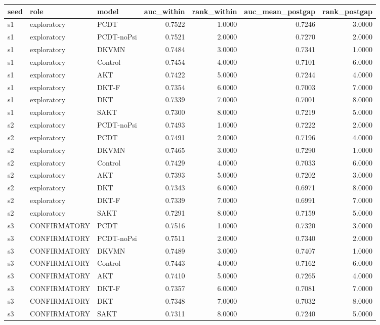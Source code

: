 \begin{tabular}{lllrrrr}
\toprule
seed & role & model & auc\_within & rank\_within & auc\_mean\_postgap & rank\_postgap \\
\midrule
s1 & exploratory & PCDT & 0.7522 & 1.0000 & 0.7246 & 3.0000 \\
s1 & exploratory & PCDT-noPsi & 0.7521 & 2.0000 & 0.7270 & 2.0000 \\
s1 & exploratory & DKVMN & 0.7484 & 3.0000 & 0.7341 & 1.0000 \\
s1 & exploratory & Control & 0.7454 & 4.0000 & 0.7101 & 6.0000 \\
s1 & exploratory & AKT & 0.7422 & 5.0000 & 0.7244 & 4.0000 \\
s1 & exploratory & DKT-F & 0.7354 & 6.0000 & 0.7003 & 7.0000 \\
s1 & exploratory & DKT & 0.7339 & 7.0000 & 0.7001 & 8.0000 \\
s1 & exploratory & SAKT & 0.7300 & 8.0000 & 0.7219 & 5.0000 \\
s2 & exploratory & PCDT-noPsi & 0.7493 & 1.0000 & 0.7222 & 2.0000 \\
s2 & exploratory & PCDT & 0.7491 & 2.0000 & 0.7196 & 4.0000 \\
s2 & exploratory & DKVMN & 0.7465 & 3.0000 & 0.7290 & 1.0000 \\
s2 & exploratory & Control & 0.7429 & 4.0000 & 0.7033 & 6.0000 \\
s2 & exploratory & AKT & 0.7393 & 5.0000 & 0.7202 & 3.0000 \\
s2 & exploratory & DKT & 0.7343 & 6.0000 & 0.6971 & 8.0000 \\
s2 & exploratory & DKT-F & 0.7339 & 7.0000 & 0.6991 & 7.0000 \\
s2 & exploratory & SAKT & 0.7291 & 8.0000 & 0.7159 & 5.0000 \\
s3 & CONFIRMATORY & PCDT & 0.7516 & 1.0000 & 0.7320 & 3.0000 \\
s3 & CONFIRMATORY & PCDT-noPsi & 0.7511 & 2.0000 & 0.7340 & 2.0000 \\
s3 & CONFIRMATORY & DKVMN & 0.7489 & 3.0000 & 0.7407 & 1.0000 \\
s3 & CONFIRMATORY & Control & 0.7443 & 4.0000 & 0.7162 & 6.0000 \\
s3 & CONFIRMATORY & AKT & 0.7410 & 5.0000 & 0.7265 & 4.0000 \\
s3 & CONFIRMATORY & DKT-F & 0.7357 & 6.0000 & 0.7081 & 7.0000 \\
s3 & CONFIRMATORY & DKT & 0.7348 & 7.0000 & 0.7032 & 8.0000 \\
s3 & CONFIRMATORY & SAKT & 0.7311 & 8.0000 & 0.7240 & 5.0000 \\
\bottomrule
\end{tabular}
